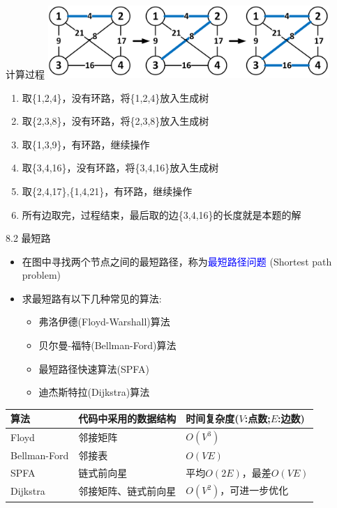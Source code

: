 \begin{frame}{计算过程}
    \includegraphics[width=0.8\textwidth,center]{fig/8-1.png}
\begin{enumerate}[(1)]
    \item 取\{1,2,4\}，没有环路，将\{1,2,4\}放入生成树\pause
    \item 取\{2,3,8\}，没有环路，将\{2,3,8\}放入生成树\pause
    \item 取\{1,3,9\}，有环路，继续操作\pause
    \item 取\{3,4,16\}，没有环路，将\{3,4,16\}放入生成树\pause
    \item 取\{2,4,17\},\{1,4,21\}，有环路，继续操作\pause
    \item 所有边取完，过程结束，最后取的边\{3,4,16\}的长度就是本题的解
\end{enumerate}
\end{frame}
\begin{frame}{8.2 最短路}
    \begin{itemize}
        \item 在图中寻找两个节点之间的最短路径，称为\textcolor{blue}{最短路径问题} (Shortest path problem)
        \item 求最短路有以下几种常见的算法:
        \begin{itemize}
            \item 弗洛伊德(Floyd-Warshall)算法
            \item 贝尔曼-福特(Bellman-Ford)算法
            \item 最短路径快速算法(SPFA)
            \item 迪杰斯特拉(Dijkstra)算法
        \end{itemize}
    \end{itemize}
    \begin{table}
        \scriptsize{
        \begin{tabular}{l|l|l}
            \textbf{算法} & \textbf{代码中采用的数据结构} & \textbf{时间复杂度($V$:点数;$E$:边数)}\\\hline
			Floyd        & 邻接矩阵                 & $O(V^3)$    \\\hline
			Bellman-Ford & 邻接表                   & $O(VE)$     \\\hline
			SPFA         & 链式前向星               & 平均$O(2E)$，最差$O(VE)$  \\\hline
			Dijkstra     & 邻接矩阵、链式前向星     & $O(V^2)$，可进一步优化   \\\hline
        \end{tabular}}
    \end{table}
\end{frame}

